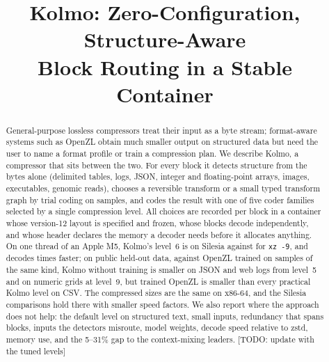 \documentclass[conference]{IEEEtran}
\newif\ifdraft
\newcommand{\todo}[1]{\noindent\fcolorbox{red}{red!6}{\parbox{\dimexpr\linewidth-2\fboxsep-2\fboxrule}{\footnotesize\textbf{TODO:} #1}}}
\newcommand{\todoin}[1]{{\color{red}\footnotesize[TODO: #1]}}
\newcommand{\todo}[1]{}
\newcommand{\todoin}[1]{}
\begin{document}
\title{Kolmo: Zero-Configuration, Structure-Aware\\Block Routing in a Stable Container}

\author{
\IEEEauthorblockA{Independent \todoin{affiliation and contact}}}

\maketitle

\begin{abstract}
General-purpose lossless compressors treat their input as a byte stream; format-aware systems such as OpenZL obtain
much smaller output on structured data but need the user to name a format profile or train a compression plan. We
describe Kolmo, a compressor that sits between the two. For every block it detects structure from the bytes alone
(delimited tables, logs, JSON, integer and floating-point arrays, images, executables, genomic reads), chooses a
reversible transform or a small typed transform graph by trial coding on samples, and codes the result with one of
five coder families selected by a single compression level. All choices are recorded per block in a container whose
version-12 layout is specified and frozen, whose blocks decode independently, and whose header declares the memory a
decoder needs before it allocates anything. On one thread of an Apple M5, Kolmo's level~6 is
\numSilKSixR{} on Silesia against \numSilxzNineR{} for \texttt{xz -9}, and decodes \numSilSixVsXzDec{} times faster;
on public held-out data, against OpenZL trained on samples of the same kind, Kolmo without training is smaller on
JSON and web logs from level~5 and on numeric grids at level~9, but trained OpenZL is smaller than every practical
Kolmo level on CSV. The compressed sizes are the same on x86-64, and the Silesia comparisons hold there with
smaller speed factors. We also report where the approach does not help: the default level on structured text, small
inputs, redundancy that spans blocks, inputs the detectors misroute, model weights, decode speed relative to zstd,
memory use, and the 5--31\% gap to the context-mixing leaders.
\todoin{update with the tuned levels}
\end{abstract}

\ifdraft
\todo{Draft of 2026-11-23 for DCC 2028. Every number in the running text is a macro from
\texttt{generated/numbers.tex}; a grey tag gives its data file in \texttt{docs/paper/data/}. Three measurement lanes
changed or will change numbers: (1) done: the x86-64 check (\S\ref{sec:x86}, PR~\#33 not merged yet); (2) done: the
OpenZL rematch on held-out data (\S\ref{sec:openzl}, PR~\#29 not merged yet); (3) the encoder tuning of
levels 1--3 and 5--7 (\S\ref{sec:levels}). Nothing here has been submitted.}
\fi
\end{document}
